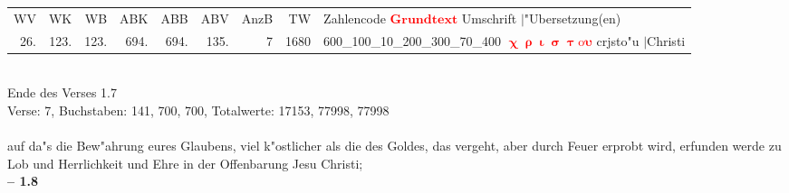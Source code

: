 \documentclass[a4paper,10pt,landscape]{article}
\begin{document}
\newpage
\begin{tabular}{rrrrrrrrp{120mm}}
WV&WK&WB&ABK&ABB&ABV&AnzB&TW&Zahlencode \textcolor{red}{$\boldsymbol{Grundtext}$} Umschrift $|$"Ubersetzung(en)\\
26.&123.&123.&694.&694.&135.&7&1680&600\_100\_10\_200\_300\_70\_400 \textcolor{red}{$\boldsymbol{\upchi\uprho\upiota\upsigma\uptau\mathrm{o}\upsilon}$} crjsto"u $|$Christi\\
\end{tabular}\medskip \\
Ende des Verses 1.7\\
Verse: 7, Buchstaben: 141, 700, 700, Totalwerte: 17153, 77998, 77998\\
\\
auf da"s die Bew"ahrung eures Glaubens, viel k"ostlicher als die des Goldes, das vergeht, aber durch Feuer erprobt wird, erfunden werde zu Lob und Herrlichkeit und Ehre in der Offenbarung Jesu Christi;\\
\newpage 
{\bf -- 1.8}\\
\medskip \\
\end{document}
